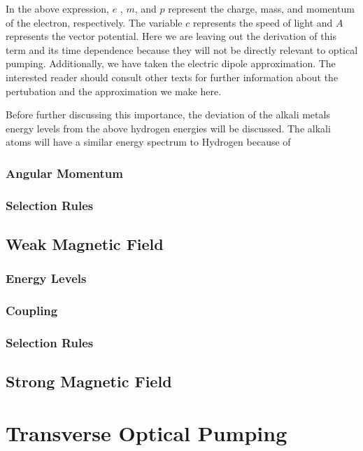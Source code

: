 \documentclass[letter,12pt]{article}
\begin{document}
		In the above expression, $e$ , $m$, and $p$ represent the charge, mass,
		and momentum of the electron, respectively. The variable $c$ represents
		the speed of light and $A$ represents the vector potential. 
		Here we are leaving out the derivation of this term and
		its time dependence because they will not be directly 
		relevant to optical pumping. Additionally, we have taken
		the electric dipole approximation. The interested reader should
		consult other texts for further information about the 
		pertubation and the approximation we make here. 

		Before further discussing this importance, the deviation of the alkali
		metals energy levels from the above hydrogen energies will be
		discussed. 
			The alkali atoms will have a similar energy spectrum to
		Hydrogen because of 

		\subsubsection{Angular Momentum}
        \label{angularMomentum}
		\subsubsection{Selection Rules}\label{selectionRules}

	\subsection{Weak Magnetic Field}
		\subsubsection{Energy Levels}
		\subsubsection{Coupling}
		\subsubsection{Selection Rules}

	\subsection{Strong Magnetic Field}

\section{Transverse Optical Pumping}
\end{document}
